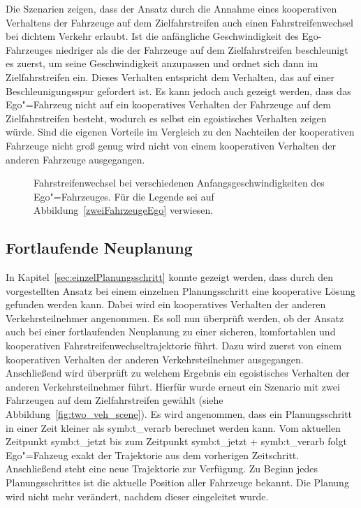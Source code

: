 Die Szenarien zeigen, dass der Ansatz durch die Annahme eines kooperativen Verhaltens der Fahrzeuge auf dem Zielfahrstreifen auch einen Fahrstreifenwechsel bei dichtem Verkehr erlaubt.
Ist die anf\"angliche Geschwindigkeit des Ego-Fahrzeuges niedriger als die der Fahrzeuge auf dem Zielfahrstreifen beschleunigt es zuerst, um seine Geschwindigkeit anzupassen und ordnet sich dann im Zielfahrstreifen ein.
Dieses Verhalten entspricht dem Verhalten, das auf einer Beschleunigungsspur gefordert ist.
Es kann jedoch auch gezeigt werden, dass das Ego"=Fahrzeug nicht auf ein kooperatives Verhalten der Fahrzeuge auf dem Zielfahrstreifen besteht, wodurch es selbst ein egoistisches Verhalten zeigen w\"urde.
Sind die eigenen Vorteile im Vergleich zu den Nachteilen der kooperativen Fahrzeuge nicht gro{\ss} genug wird nicht von einem kooperativen Verhalten der anderen Fahrzeuge ausgegangen.


\begin{figure}[!htbp]
    \centering
    \label{fig:VerschiedeneGeschwindigkeiten}
    \caption[Verschiedene Anfangsgeschwindigkeiten]{Fahrstreifenwechsel bei verschiedenen Anfangsgeschwindigkeiten des Ego"=Fahrzeuges. F\"ur die Legende sei auf Abbildung~\ref{zweiFahrzeugeEgo} verwiesen.}
\end{figure}




\subsection{Fortlaufende Neuplanung}
\label{sec:AuswertungNauplanung}
In Kapitel~\ref{sec:einzelPlanungsschritt} konnte gezeigt werden, dass durch den vorgestellten Ansatz bei einem einzelnen Planungsschritt eine kooperative L\"osung gefunden werden kann.
Dabei wird ein kooperatives Verhalten der anderen Verkehrsteilnehmer angenommen.
Es soll nun \"uberpr\"uft werden, ob der Ansatz auch bei einer fortlaufenden Neuplanung zu einer sicheren, komfortablen und kooperativen Fahrstreifenwechseltrajektorie f\"uhrt.
Dazu wird zuerst von einem kooperativen Verhalten der anderen Verkehrsteilnehmer ausgegangen.
Anschlie{\ss}end wird \"uberpr\"uft zu welchem Ergebnis ein egoistisches Verhalten der anderen Verkehrsteilnehmer f\"uhrt.
Hierf\"ur wurde erneut ein Szenario mit zwei Fahrzeugen auf dem Zielfahrstreifen gew\"ahlt (siehe Abbildung~\ref{fig:two_veh_scene}).
Es wird angenommen, dass ein Planungsschritt in einer Zeit kleiner als \gls{symb:t_verarb} berechnet werden kann. 
Vom aktuellen Zeitpunkt  \gls{symb:t_jetzt} bis zum Zeitpunkt \gls{symb:t_jetzt} + \gls{symb:t_verarb} folgt Ego"=Fahzeug exakt der Trajektorie aus dem vorherigen Zeitschritt.
Anschlie{\ss}end steht eine neue Trajektorie zur Verf\"ugung.
Zu Beginn jedes Planungsschrittes ist die aktuelle Position aller Fahrzeuge bekannt.
Die Planung wird nicht mehr ver\"andert, nachdem dieser eingeleitet wurde.

